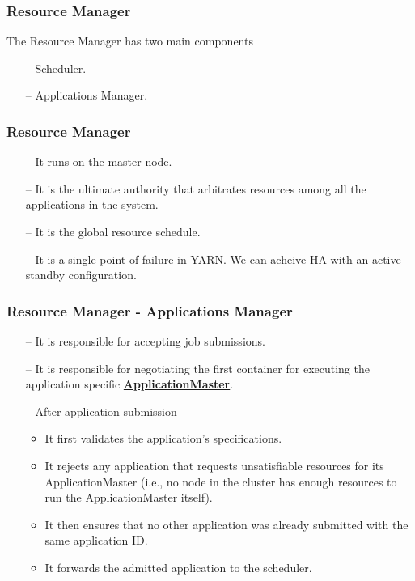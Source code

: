 \begin{frame}[c]{ }
	\frametitle{Resource Manager }
	The Resource Manager has two main components
	{\footnotesize
		\begin{itemize}  [<+->]
			\item [--] Scheduler.
			\item [--] Applications Manager.
		\end{itemize}
	}
\end{frame}
\begin{frame}[c]{ }
	\frametitle{Resource Manager }
	{\footnotesize
		\begin{itemize}  [<+->]
			\item [--] It runs on the master node.
			\item [--] It is the ultimate authority that arbitrates resources among all the applications in the system.
			\item [--] It is the global resource schedule.
			\item [--] It is a single point of failure in YARN. We can acheive HA with an active-standby configuration.
		\end{itemize}
	}
\end{frame}
\begin{frame}[c]{ }
	\frametitle{Resource Manager - Applications Manager}
	
	{\footnotesize
		\begin{itemize}  [<+->]
			\item [--] It is responsible for accepting job submissions.
			\item [--] It is responsible for negotiating the first container for executing the application specific \textcolor{offyellow}{ \underline{ \textbf{ApplicationMaster}}}.
			\item [--] After application submission
			\begin{itemize}  [<+-> \color{almond}]
				\item It first validates the application’s specifications.
				\item It rejects any application that requests unsatisfiable resources for its ApplicationMaster (i.e., no node in the cluster has enough resources to run the ApplicationMaster itself).
				\item It then ensures that no other application was already submitted with the same application ID.
				\item It forwards the admitted application to the scheduler.
			\end{itemize}
		\end{itemize}
	}
\end{frame}
